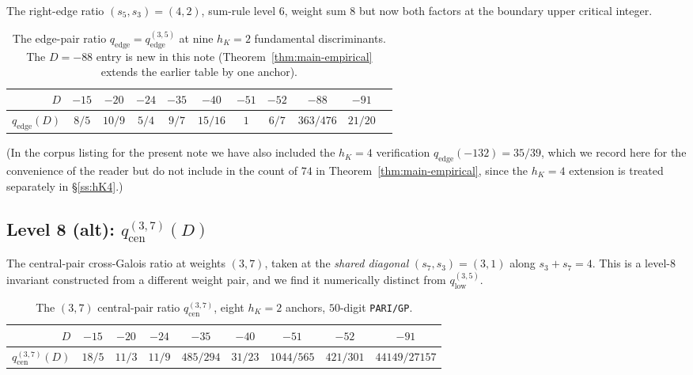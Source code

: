 \documentclass[11pt,a4paper]{amsart}
\theoremstyle{plain}
\theoremstyle{definition}
\newcommand{\qstr}[2]{q^{(#1,#2)}}
\begin{document}
The right-edge ratio $(s_5, s_3) = (4, 2)$, sum-rule level $6$, weight sum
$8$ but now both factors at the boundary upper critical integer.

\begin{table}[h]
\centering
\caption{The edge-pair ratio $q_{\mathrm{edge}} = \qstr{3}{5}_{\mathrm{edge}}$
at nine $h_K = 2$ fundamental discriminants. The $D = -88$ entry is new in
this note (Theorem~\ref{thm:main-empirical} extends the earlier table by one
anchor).}\label{tab:level2}
\begin{tabular}{rcccccccccc}
\toprule
$D$ & $-15$ & $-20$ & $-24$ & $-35$ & $-40$ & $-51$ & $-52$ & $-88$ & $-91$\\
\midrule
$q_{\mathrm{edge}}(D)$ & $8/5$ & $10/9$ & $5/4$ & $9/7$ & $15/16$ & $1$ & $6/7$ & $363/476$ & $21/20$\\
\bottomrule
\end{tabular}
\end{table}

(In the corpus listing for the present note we have also included the
$h_K = 4$ verification $q_{\mathrm{edge}}(-132) = 35/39$, which we record
here for the convenience of the reader but do not include in the count of
$74$ in Theorem~\ref{thm:main-empirical}, since the $h_K = 4$ extension is
treated separately in \S\ref{ss:hK4}.)

\subsection{Level 8 (alt): $\qstr{3}{7}_{\mathrm{cen}}(D)$}\label{ss:lev3}

The central-pair cross-Galois ratio at weights $(3, 7)$, taken at the
\emph{shared diagonal} $(s_7, s_3) = (3, 1)$ along $s_3 + s_7 = 4$.
This is a level-8 invariant constructed from a different weight pair, and we
find it numerically distinct from $\qstr{3}{5}_{\mathrm{low}}$.

\begin{table}[h]
\centering
\caption{The $(3,7)$ central-pair ratio $\qstr{3}{7}_{\mathrm{cen}}$, eight
$h_K = 2$ anchors, $50$-digit \texttt{PARI/GP}.}\label{tab:level3}
\begin{tabular}{rcccccccc}
\toprule
$D$ & $-15$ & $-20$ & $-24$ & $-35$ & $-40$ & $-51$ & $-52$ & $-91$\\
\midrule
$\qstr{3}{7}_{\mathrm{cen}}(D)$
 & $18/5$ & $11/3$ & $11/9$ & $485/294$ & $31/23$ & $1044/565$ & $421/301$ & $44149/27157$\\
\bottomrule
\end{tabular}
\end{table}
\end{document}
